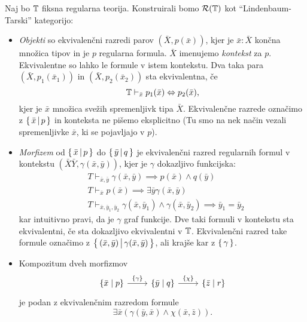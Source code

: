 \documentclass[../kategoricna_logika.tex]{subfiles}
\begin{document}
\begin{definicija}
  Naj bo $\mathbb{T}$ fiksna regularna teorija. Konstruirali bomo
  $\mathcal{R}(\mathbb{T})$ kot "`Lindenbaum-Tarski"' kategorijo:
  \begin{itemize}
  \item \emph{Objekti} so ekvivalenčni razredi parov
    $(\bar{X}, p(\bar{x}))$, kjer je $\bar{x} : \bar{X}$ končna
    množica tipov in je $p$ regularna formula.  $\bar{X}$ imenujemo
    \emph{kontekst} za $p$. Ekvivalentne so lahko le formule v istem
    kontekstu.  Dva taka para $(\bar{X}, p_1(\bar{x}_1))$ in
    $(\bar{X}, p_2(\bar{x}_2))$ sta ekvivalentna, če
      $$\mathbb{T} \vdash_{\bar{x}} p_1(\bar{x}) \Leftrightarrow p_2(\bar{x}),$$
      kjer je $\bar{x}$ množica svežih spremenljivk tipa $\bar{X}$.
      Ekvivalenčne razrede označimo z $\left\lbrace\,\bar{x} \,\middle|\, p\,\right\rbrace$
      in konteksta ne pišemo eksplicitno (Tu smo na nek način vezali
      spremenljivke $\bar{x}$, ki se pojavljajo v $p$).
    \item \emph{Morfizem} od $\left\lbrace\,\bar{x} \,\middle|\, p\,\right\rbrace$ do
      $\left\lbrace\,\bar{y} \,\middle|\, q\,\right\rbrace$ je ekvivalenčni razred regularnih
      formul v kontekstu $(\bar{X}\bar{Y}, \gamma(\bar{x},\bar{y}))$,
      kjer je $\gamma$ dokazljivo funkcijska:
      \begin{align*}
        &T \vdash_{\bar{x},\bar{y}} \gamma(\bar{x},\bar{y})  \implies p(\bar{x}) \wedge q(\bar{y}) \\
        &T \vdash_{\bar{x}} p(\bar{x}) \implies \exists \bar{y} \gamma(\bar{x},\bar{y}) \\
        &T \vdash_{\bar{x},\bar{y}_1,\bar{y}_2} \gamma(\bar{x},\bar{y}_1) \wedge \gamma(\bar{x},\bar{y}_2) \implies \bar{y}_1 = \bar{y}_2
      \end{align*}
      kar intuitivno pravi, da je $\gamma$ graf funkcije.  Dve taki
      formuli v kontekstu sta ekvivalentni, če sta dokazljivo
      ekvivalentni v $\mathbb{T}$.  Ekvivalenčni razred take formule označimo
      z
      $\left\lbrace\,(\bar{x},\bar{y}) \,\middle|\, \gamma(\bar{x},\bar{y})\,\right\rbrace$,
      ali krajše kar z $\left\lbrace\,\gamma\,\right\rbrace$.
    \item Kompozitum dveh morfizmov
      \begin{equation*}
        \begin{tikzcd}[column sep=normal]
          \lbrace \bar{x} \mid p\rbrace \ar[r, "\lbrace \gamma
          \rbrace"] & \lbrace \bar{y} \mid q \rbrace \ar[r, "\lbrace
          \chi \rbrace"] & \lbrace \bar{z} \mid r \rbrace
        \end{tikzcd}
      \end{equation*}           
      je podan z ekvivalenčnim razredom formule
      $$\exists \bar{x}(\gamma(\bar{y},\bar{x}) \wedge \chi(\bar{x},\bar{z})).$$
    \end{itemize}
  \end{definicija}
\end{document}
